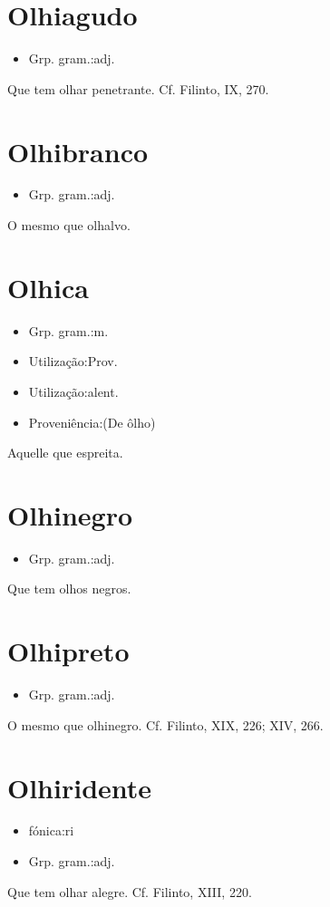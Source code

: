 \section{Olhiagudo}
\begin{itemize}
\item {Grp. gram.:adj.}
\end{itemize}
Que tem olhar penetrante. Cf. Filinto, IX, 270.
\section{Olhibranco}
\begin{itemize}
\item {Grp. gram.:adj.}
\end{itemize}
O mesmo que \textunderscore olhalvo\textunderscore .
\section{Olhica}
\begin{itemize}
\item {Grp. gram.:m.}
\end{itemize}
\begin{itemize}
\item {Utilização:Prov.}
\end{itemize}
\begin{itemize}
\item {Utilização:alent.}
\end{itemize}
\begin{itemize}
\item {Proveniência:(De \textunderscore ôlho\textunderscore )}
\end{itemize}
Aquelle que espreita.
\section{Olhinegro}
\begin{itemize}
\item {Grp. gram.:adj.}
\end{itemize}
Que tem olhos negros.
\section{Olhipreto}
\begin{itemize}
\item {Grp. gram.:adj.}
\end{itemize}
O mesmo que \textunderscore olhinegro\textunderscore . Cf. Filinto, XIX, 226; XIV, 266.
\section{Olhiridente}
\begin{itemize}
\item {fónica:ri}
\end{itemize}
\begin{itemize}
\item {Grp. gram.:adj.}
\end{itemize}
Que tem olhar alegre. Cf. Filinto, XIII, 220.
